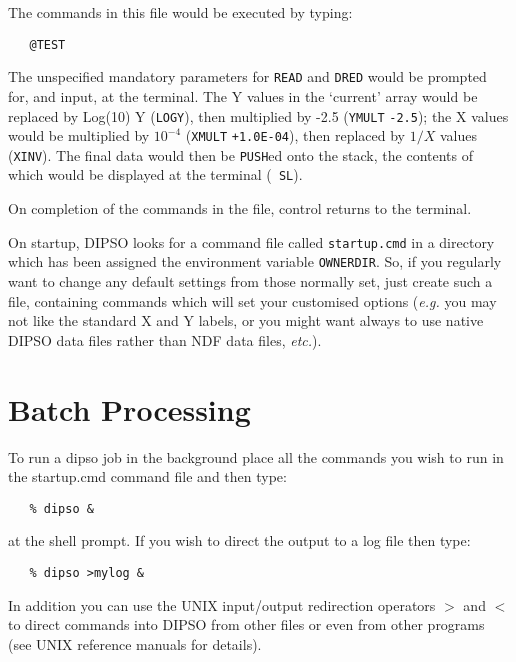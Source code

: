 \documentclass[twoside,11pt]{article}
\newcommand{\htmlref}[2]{#1}
\renewcommand{\_}{\texttt{\symbol{95}}}
\begin{document}
The commands in this file would be executed by typing:

\begin{verbatim}
   @TEST
\end{verbatim}

The unspecified mandatory parameters for \htmlref{{\tt{READ}}}{COM:READ} 
and \htmlref{{\tt{DRED}}}{COM:DRED}  would be prompted for, and input, at
the terminal. The Y values in the `current' array would be replaced by
Log(10) Y (\htmlref{{\tt{LOGY}}}{COM:LOGY}),  then multiplied by -2.5
(\htmlref{{\tt{YMULT}}}{COM:YMULT}  {\tt{-2.5}});  the X values would be multiplied
by $10^{-4}$ (\htmlref{{\tt{XMULT}}}{COM:XMULT}  {\tt{+1.0E-04}}),  then replaced
by $1/X$ values (\htmlref{{\tt{XINV}}}{COM:XINV}).  The final data
would then be \htmlref{{\tt{PUSH}}}{COM:PUSH}ed  onto the stack, the
contents of which would be displayed at the terminal (\htmlref{{\tt
SL}}{COM:SL}).

On completion of the commands in the file, control returns to the terminal.

On startup, DIPSO looks for a command file called {\tt{startup.cmd}} 
in a directory which has been
assigned the environment variable {\tt{OWNERDIR}}.  So, if
you regularly want to change any default settings from those normally
set, just create such a file, containing commands which will set your
customised options ({\em e.g.} you may not like the standard X and Y
labels, or you might want always to use native DIPSO data files rather
than NDF data files, {\em etc.}).

\section {Batch Processing}

To run a dipso job in the background place all the commands you wish
to run in the startup.cmd command file and then type:

\begin{verbatim}
   % dipso &
\end{verbatim}

at the shell prompt. If you wish to direct the output to a log file
then type:

\begin{verbatim}
   % dipso >mylog &
\end{verbatim}

In addition you can use the UNIX input/output redirection operators
\(>\) and \(<\) to direct commands into DIPSO from other files or even
from other programs (see UNIX reference manuals for details).
\end{document}
